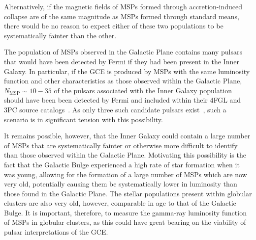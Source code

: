 \documentclass[a4paper,11pt]{article}
\begin{document}
%
Alternatively, if the magnetic fields of MSPs formed through accretion-induced collapse are of the same magnitude as MSPs formed through standard means, there would be no reason to expect either of these two populations to be systematically fainter than the other.



The population of MSPs observed in the Galactic Plane contains many pulsars that would have been detected by Fermi if they had been present in the Inner Galaxy. In particular, if the GCE is produced by MSPs with the same luminosity function and other characteristics as those observed within the Galactic Plane, $N_\textrm{MSP} \sim 10-35$ of the pulsars associated with the Inner Galaxy population should have been been detected by Fermi and included within their 4FGL and 3PC source catalogs~\cite{Holst:2024fvb,Fermi-LAT:2023zzt}. As only three such candidate pulsars exist~\cite{Holst:2024fvb}, such a scenario is in significant tension with this possibility.

It remains possible, however, that the Inner Galaxy could contain a large number of MSPs that are systematically fainter or otherwise more difficult to identify than those observed within the Galactic Plane. Motivating this possibility is the fact that the Galactic Bulge experienced a high rate of star formation when it was young, allowing for the formation of a large number of MSPs which are now very old, potentially causing them be systematically lower in luminosity than those found in the Galactic Plane. The stellar populations present within globular clusters are also very old, however, comparable in age to that of the Galactic Bulge. It is important, therefore, to measure the gamma-ray luminosity function of MSPs in globular clusters, as this could have great bearing on the viability of pulsar interpretations of the GCE. 
\end{document}
